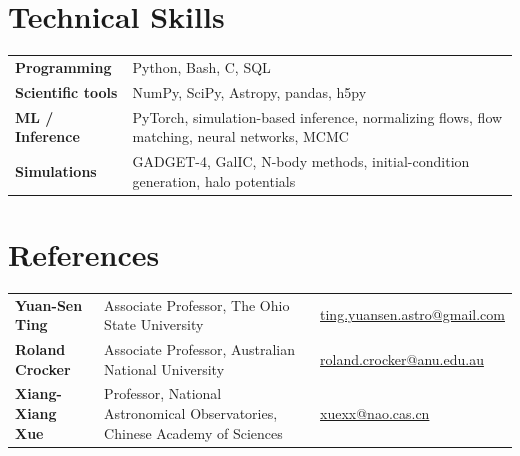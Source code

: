 \documentclass[11pt,a4paper]{article}
\newcommand{\cvsection}[1]{\Needspace{4\baselineskip}\section*{#1}}
\begin{document}
\cvsection{Technical Skills}

\begin{tabularx}{\textwidth}{@{}p{3.3cm}X@{}}
\textbf{Programming} & Python, Bash, C, SQL \\[2pt]
\textbf{Scientific tools} & NumPy, SciPy, Astropy, pandas, h5py \\[2pt]
\textbf{ML / Inference} & PyTorch, simulation-based inference, normalizing flows, flow matching, neural networks, MCMC \\[2pt]
\textbf{Simulations} & GADGET-4, GalIC, N-body methods, initial-condition generation, halo potentials \\
\end{tabularx}

\cvsection{References}

\small
\begin{tabularx}{\textwidth}{@{}p{3.1cm}p{7.8cm}X@{}}
\textbf{Yuan-Sen Ting} & Associate Professor, The Ohio State University
  & \href{mailto:ting.yuansen.astro@gmail.com}{ting.yuansen.astro@gmail.com} \\[3pt]
\textbf{Roland Crocker} & Associate Professor, Australian National University
  & \href{mailto:roland.crocker@anu.edu.au}{roland.crocker@anu.edu.au} \\[3pt]
\textbf{Xiang-Xiang Xue} & Professor, National Astronomical Observatories, Chinese Academy of Sciences
  & \href{mailto:xuexx@nao.cas.cn}{xuexx@nao.cas.cn} \\
\end{tabularx}
\normalsize
\end{document}
